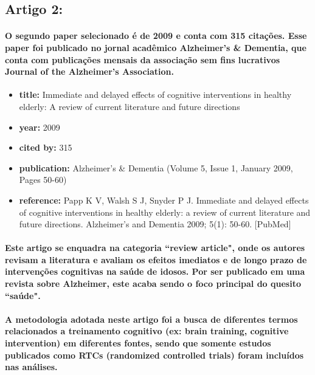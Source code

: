 \documentclass[a4paper]{article}    %
\begin{document}
\newpage

\subsection*{Artigo 2:}

\paragraph{O segundo paper selecionado é de 2009 e conta com 315 citações. Esse paper foi publicado no jornal acadêmico Alzheimer's \& Dementia, que conta com publicações mensais da associação sem fins lucrativos Journal of the Alzheimer's Association.}

\begin{itemize}
    \item \textbf{title:} Immediate and delayed effects of cognitive interventions in healthy elderly: A review of current literature and future directions
    \item \textbf{year:} 2009
    \item \textbf{cited by:} 315
    \item \textbf{publication:} Alzheimer's \& Dementia (Volume 5, Issue 1, January 2009, Pages 50-60)
    \item \textbf{reference:} Papp K V, Walsh S J, Snyder P J. Immediate and delayed effects of cognitive interventions in healthy elderly: a review of current literature and future directions. Alzheimer's and Dementia 2009; 5(1): 50-60. [PubMed]
\end{itemize}

\paragraph{Este artigo se enquadra na categoria ``review article", onde os autores revisam a literatura e avaliam os efeitos imediatos e de longo prazo de intervenções cognitivas na saúde de idosos. Por ser publicado em uma revista sobre Alzheimer, este acaba sendo o foco principal do quesito ``saúde".}

\paragraph{A metodologia adotada neste artigo foi a busca de diferentes termos relacionados a treinamento cognitivo (ex: brain training, cognitive intervention) em diferentes fontes, sendo que somente estudos publicados como RTCs (randomized controlled trials) foram incluídos nas análises.}
\end{document}
